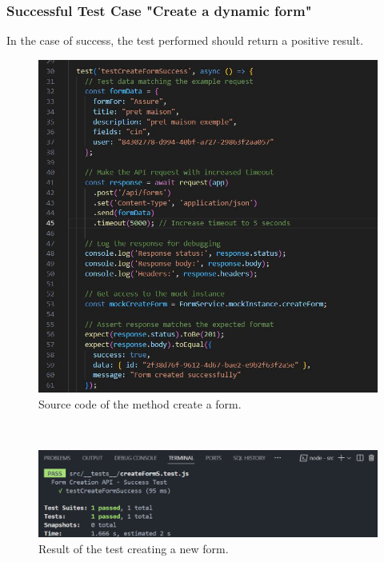 \subsubsection{Successful Test Case "Create a dynamic form"} 
In the case of success, the test performed should return a positive result.
\begin{figure}[h!]
    \centering
    \includegraphics[width=1\textwidth]{figures/createformScode.JPG}
    \caption{Source code of the method create a form.}
\end{figure} \
\clearpage
\begin{figure}[h!]
    \centering
    \includegraphics[width=1\textwidth]{figures/test succes create form.png} 
    \caption{Result of the test creating a new form.}
\end{figure} \

